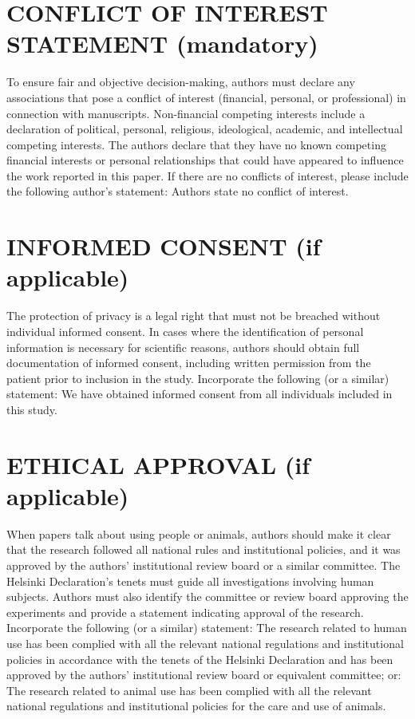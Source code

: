 \documentclass{iaesarticle}
\begin{document}
\section*{CONFLICT OF INTEREST STATEMENT (mandatory)}
\label{}
To ensure fair and objective decision-making, authors must declare any associations that pose a conflict of interest (financial, personal, or professional) in connection with manuscripts. Non-financial competing interests include a declaration of political, personal, religious, ideological, academic, and intellectual competing interests. The authors declare that they have no known competing financial interests or personal relationships that could have appeared to influence the work reported in this paper. If there are no conflicts of interest, please include the following author's statement: Authors state no conflict of interest.

\section*{INFORMED CONSENT (if applicable)}
\label{}
The protection of privacy is a legal right that must not be breached without individual informed consent. In cases where the identification of personal information is necessary for scientific reasons, authors should obtain full documentation of informed consent, including written permission from the patient prior to inclusion in the study. Incorporate the following (or a similar) statement: We have obtained informed consent from all individuals included in this study.

\section*{ETHICAL APPROVAL (if applicable)}
\label{}
When papers talk about using people or animals, authors should make it clear that the research followed all national rules and institutional policies, and it was approved by the authors' institutional review board or a similar committee. The Helsinki Declaration's tenets must guide all investigations involving human subjects. Authors must also identify the committee or review board approving the experiments and provide a statement indicating approval of the research. Incorporate the following (or a similar) statement: The research related to human use has been complied with all the relevant national regulations and institutional policies in accordance with the tenets of the Helsinki Declaration and has been approved by the authors' institutional review board or equivalent committee; or: The research related to animal use has been complied with all the relevant national regulations and institutional policies for the care and use of animals.
\end{document}
